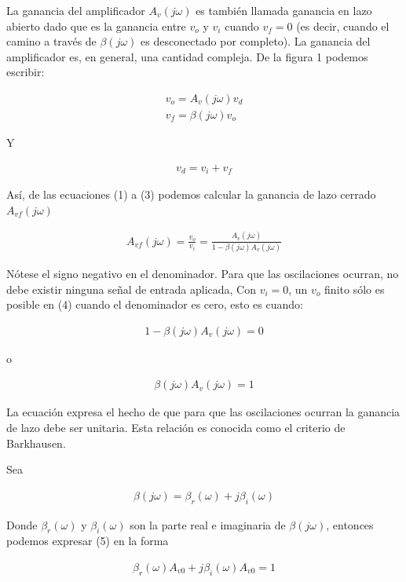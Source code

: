 \documentclass{article}
\begin{document}
La ganancia del amplificador $A_v(j \omega)$ es también llamada ganancia en lazo abierto dado que es la ganancia entre $v_o$ y $v_i$ cuando $v_f=0$ (es decir, cuando el camino a través de $\beta (j\omega)$ es desconectado por completo). La ganancia del amplificador es, en general, una cantidad compleja. De la figura 1 podemos escribir:

\begin{align}
	v_o = A_v (j \omega)v_d  \\
	v_f = \beta (j \omega) v_o
\end{align}

Y

\begin{align}
	v_d = v_i + v_f
\end{align}

Así, de las ecuaciones (1) a (3) podemos calcular la ganancia de lazo cerrado $A_{vf}(j \omega)$


\begin{align}
	A_{vf}(j \omega) = \frac{v_o}{v_i} = \frac{A_v(j\omega)}{1 - \beta(j \omega) A_v (j \omega)}
\end{align}

Nótese el signo negativo en el denominador. Para que las oscilaciones ocurran, no debe existir ninguna señal de entrada aplicada, Con $v_i = 0$, un $v_o$ finito sólo es posible en (4) cuando el denominador es cero, esto es cuando:

\begin{align}
	1 - \beta (j\omega)A_v (j\omega) = 0 \nonumber
\end{align}

o 

\begin{align}
	\beta (j\omega)A_v (j\omega) = 1
\end{align}

La ecuación expresa el hecho de que para que las oscilaciones ocurran la ganancia de lazo debe ser unitaria. Esta relación es conocida como el criterio de Barkhausen.

Sea

\begin{align}
	\beta (j \omega) = \beta_r(\omega) + j\beta_i (\omega)
\end{align}

Donde $\beta_r(\omega)$ y $\beta_i(\omega)$ son la parte real e imaginaria de $\beta(j\omega)$, entonces podemos expresar (5) en la forma

\begin{align}
	\beta_r(\omega)A_{v0} + j\beta_i(\omega)A_{v0} = 1\nonumber
\end{align}
\end{document}
